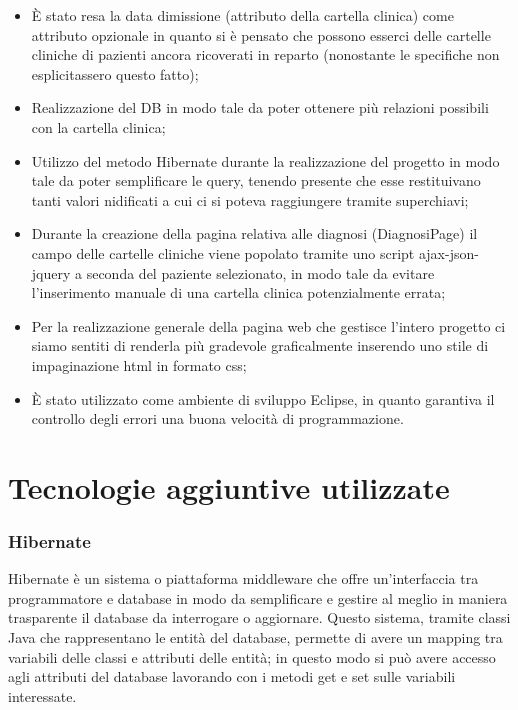\documentclass[a4paper,titlepage]{article}
\begin{document}
\begin{itemize}[leftmargin=1.5cm, topsep=0.5cm, itemsep=0.2cm]

\item È stato resa la data dimissione (attributo della cartella clinica) come attributo opzionale in quanto si è pensato che possono esserci delle cartelle cliniche di pazienti ancora ricoverati in reparto (nonostante le specifiche non esplicitassero questo fatto);

\item Realizzazione del DB in modo tale da poter ottenere più relazioni possibili con la cartella clinica;
\item Utilizzo del metodo Hibernate durante la realizzazione del progetto in modo tale da poter semplificare le query, tenendo presente che esse restituivano tanti valori nidificati a cui ci si poteva raggiungere tramite superchiavi;
\item Durante la creazione della pagina relativa alle diagnosi (DiagnosiPage) il campo delle cartelle cliniche viene popolato tramite uno script ajax-json-jquery a seconda del paziente selezionato, in modo tale da evitare l'inserimento manuale di una cartella clinica potenzialmente errata;
\item Per la realizzazione generale della pagina web che gestisce l'intero progetto ci siamo sentiti di renderla più gradevole graficalmente inserendo uno stile di impaginazione html in formato css;
\item È stato utilizzato come ambiente di sviluppo Eclipse, in quanto garantiva il controllo degli errori una buona velocità di programmazione.

\end{itemize}


\part{Tecnologie aggiuntive utilizzate}

\section{Hibernate}

Hibernate è un sistema o piattaforma middleware che offre un'interfaccia tra programmatore e database in modo da semplificare e gestire al meglio in maniera trasparente il database da interrogare o aggiornare. Questo sistema, tramite classi Java che rappresentano le entità del database, permette di avere un mapping tra variabili delle classi e attributi delle entità; in questo modo si può avere accesso agli attributi del database lavorando con i metodi get e set sulle variabili interessate.
\end{document}
